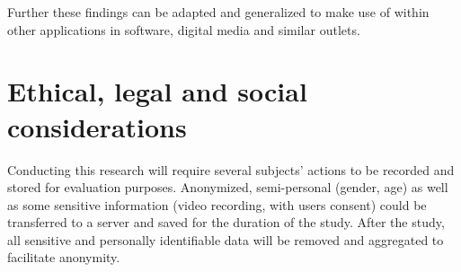 Further these findings can be adapted and generalized to make use of within other applications in software, digital media and similar outlets.

\section{Ethical, legal and social considerations}

Conducting this research will require several subjects' actions to be recorded and stored for evaluation purposes.
Anonymized, semi-personal (gender, age) as well as some sensitive information (video recording, with users consent) could be transferred to a server and saved for the duration of the study.
After the study, all sensitive and personally identifiable data will be removed and aggregated to facilitate anonymity.